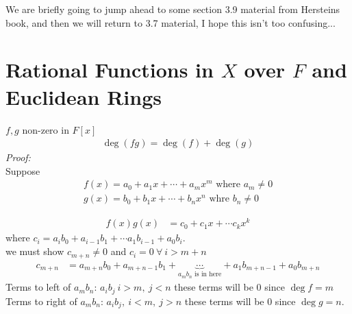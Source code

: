 \setcounter{section}{8}
\begin{tcolorbox}
    We are briefly going to jump ahead to some section 3.9 material from Hersteins book, and then we will return to 3.7 material, I hope this isn't too confusing...
\end{tcolorbox}
\section{Rational Functions in $X$ over $F$ and Euclidean Rings}
\begin{lemma}
    $f,g$ non-zero in $F[x]$
    \begin{align}
        \deg(fg)= \deg(f)+\deg(g) \nonumber
    \end{align}
    \textit{Proof:} \\
    \noindent Suppose 
    \begin{align}
        f(x)= a_0 +a_1x+\cdots + a_mx^m \text{ where } a_m \neq 0 \nonumber \\
        g(x)= b_0 +b_1x + \cdots + b_nx^n \text{ whre } b_n\neq 0 \nonumber
    \end{align}

    \begin{align}
        f(x)g(x) &= c_0 + c_1x + \cdots c_kx^k \nonumber
    \end{align}
    where $c_i = a_ib_0 + a_{i-1}b_1 + \cdots a_1b_{i-1} + a_0 b_i$. \\
    \noindent we must show $c_{m+n}\neq 0$ and $c_i = 0 \ \forall \ i >m+n$
    \begin{align}
        c_{m+n} &= a_{m+n} b_0 + a_{m+n-1}b_1 + \underbrace{\cdots}_{a_mb_n \text{ is in here}}+ a_1b_{m+n-1}+a_0b_{m+n} \nonumber
    \end{align}
    Terms to left of $a_mb_n$: $a_ib_j \ i>m, \ j <n$ these terms will be $0$ since $\deg f = m$ \\
    \noindent Terms to right of $a_mb_n$: $a_ib_j, \ i<m, \ j>n$ these terms will be $0$ since $\deg g = n$. \\


\end{lemma}
